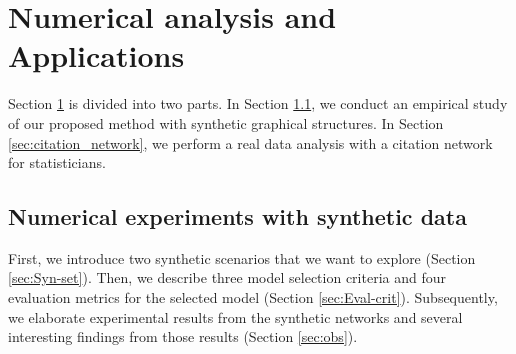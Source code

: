 \documentclass[AMS,STIX1COL]{WileyNJD-v2}
\begin{document}
{\section{ Numerical analysis and Applications}
\label{sec:Num-anal}
Section \ref{sec:Num-anal} is divided into two parts.
In Section \ref{sec:Syn-dat}, we conduct an empirical study of our proposed method with synthetic graphical structures.
In Section \ref{sec:citation_network}, we perform a real data analysis with a citation network for statisticians.


\subsection{Numerical experiments with synthetic data}
\label{sec:Syn-dat}
First, we introduce two synthetic scenarios that we want to explore (Section \ref{sec:Syn-set}).
Then, we describe three model selection criteria and four evaluation metrics for the selected model
(Section \ref{sec:Eval-crit}).
Subsequently, we elaborate experimental results from the synthetic networks and several interesting findings from those results (Section \ref{sec:obs}).

}
\end{document}
